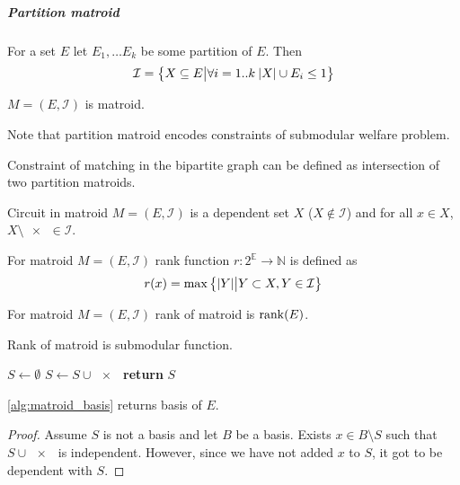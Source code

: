 \subparagraph{Partition matroid}
For a set $E$ let $E_1,\dots E_k$ be some partition of $E$. Then
\begin{align}
\mathcal{I}= \qty\big{ X\subseteq E \big\vert \forall i=1..k \: \abs{X}\cup E_i  \leq 1  }
\end{align}
\begin{prop}
	$M=(E,\mathcal{I})$ is matroid.
\end{prop}
Note that partition matroid encodes constraints of submodular welfare problem.

Constraint of matching in the bipartite graph can be defined as intersection of two partition matroids.

\begin{definition}[Circuit]
	Circuit in matroid $M=(E,\mathcal{I})$ is a dependent set $X$ ($X\notin \mathcal{I}$) and for all $x\in X$, $X\setminus \qty{x} \in \mathcal{I}$.
\end{definition}
\begin{definition}
For matroid $M=(E,\mathcal{I})$ rank function $r: 2^{\mathbb{E}} \to \mathbb{N}$ is defined as
\begin{align}
r(x) = \max \qty\big{\abs{Y} \big| Y\subset{X}, Y\in \mathcal{I}}
\end{align}
\end{definition}
\begin{definition}
For matroid $M=(E,\mathcal{I})$ rank of matroid is $\rank(E)$.
\end{definition}
\begin{prop}
	Rank of matroid is submodular function.
\end{prop}


\begin{algorithm}
	\caption{}\label{alg:matroid_basis}
	\begin{algorithmic}[1]
		\State $S \gets \emptyset$
		\State $S\gets S\cup \qty{x}$
		\EndIf
		\EndFor
		\State \textbf{return} $S$
		\EndProcedure
	\end{algorithmic}
\end{algorithm}

\begin{prop}
	\vref{alg:matroid_basis} returns basis of $E$.
	\begin{proof}
		Assume $S$ is not a basis and let $B$ be a basis. Exists $x\in B\setminus S$ such that $S\cup \qty{x}$ is independent. However, since we have not added $x$ to $S$, it got to be dependent with $S$.
	\end{proof}
\end{prop}

